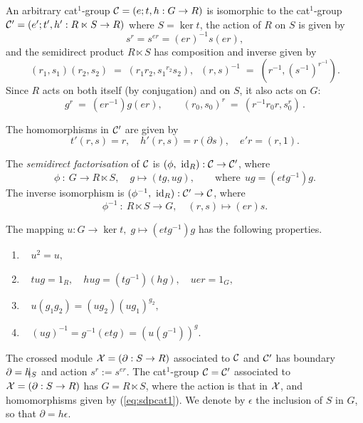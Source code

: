 An arbitrary cat$^1$-group  $\mathcal{C} = (e;t,h : G \to R)$
is isomorphic to the cat$^1$-group
$\mathcal{C}' = (e';t',h' : R \ltimes S \to R)$
where  $S = \ker t$,  
the action of $R$ on $S$ is given by
$$
s^r = s^{er} = (er)^{-1} s (er),
$$
and the semidirect product  $R \ltimes S$  
has composition and inverse given by
$$
(r_1,s_1)(r_2,s_2) \; = \; (r_1r_2,{s_1}^{r_2}s_2), \;\;
(r,s)^{-1}  \; = \; (r^{-1}, (s^{-1})^{r^{-1}}).
$$
Since $R$ acts on both itself (by conjugation) and on $S$,
it also acts on $G$:
\begin{equation} \label{eq:RactsonG}
g^r ~=~ (er^{-1})g(er),  \quad\quad
(r_0,s_0)^r ~=~ (r^{-1}r_0r, s_0^r)\,.
\end{equation}

\noindent
The homomorphisms in  $\mathcal{C}'$  are given by
\begin{equation} \label{eq:sdpcat1}
t'(r,s) = r, \quad h'(r,s) = r(\partial s), \quad e'r = (r,1).
\end{equation}

\begin{defn} 
The \emph{semidirect factorisation} of $\mathcal{C}$ is 
$(\phi, ~\mathrm{id}_R) : \mathcal{C} \to \mathcal{C}'$, where
\begin{equation} \label{eq:cat1-sdp-fact} 
\phi ~:~ G \to R \ltimes S, \quad g \mapsto (tg,ug),
\qquad\mbox{where}~~  ug = (etg^{-1})g. 
\end{equation}
The inverse isomorphism is  $(\phi^{-1}, ~\mathrm{id}_R) : \mathcal{C}' \to \mathcal{C}$, where 
$$
\phi^{-1} ~:~ R \ltimes S \to G, \quad (r,s) \mapsto (er)s.
$$ 
\end{defn}

\begin{lem} \label{lem:u-props}
The mapping $u : G \to \ker t,\; g \mapsto (etg^{-1})g$ has the
following properties.
\begin{enumerate}[{\rm (i)}]
\item~ $u^2 = u,$
\item~ $tug = 1_R,\quad hug = (tg^{-1})(hg),\quad uer = 1_G, $
\item~ $u(g_1g_2) = (ug_2)(ug_1)^{g_2},$
\item~ $(ug)^{-1} = g^{-1}(etg) = (u(g^{-1}))^g.$
\end{enumerate}
\end{lem}
The crossed module $\mathcal{X} = (\partial : S \to R)$  
associated to  $\mathcal{C}$  and  $\mathcal{C}'$  has boundary 
$\partial = h\hspace{-5pt}\mid_S$ and action $s^r := s^{er}$. 
The cat$^1$-group  $\mathcal{C} = \mathcal{C}'$  associated to  
$\mathcal{X} = (\partial : S \to R)$  has  $G = R \ltimes S$, 
where the action is that in  $\mathcal{X}$,
and homomorphisms given by (\ref{eq:sdpcat1}).
We denote by  $\epsilon$  the inclusion of  $S$  in  $G$,
so that  $\partial = h \epsilon$.

